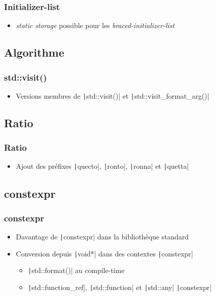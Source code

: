 \documentclass[C++.tex]{subfiles}
\begin{document}
\begin{frame}[fragile]
	\frametitle{Initializer-list}
	\begin{itemize}
		\item \textit{static storage} possible pour les \textit{braced-initializer-list}
		
	\end{itemize}
\end{frame}

\subsection*{Algorithme}
\begin{frame}[fragile]
	\frametitle{{\NoAutoSpacing std::visit()}}
	\begin{itemize}
		\item Versions membres de \texttt|std::visit()| et \texttt|std::visit_format_arg()|
	\end{itemize}
\end{frame}

\subsection*{Ratio}
\begin{frame}[fragile]
	\frametitle{Ratio}
	\begin{itemize}
		\item Ajout des préfixes \texttt|quecto|, \texttt|ronto|, \texttt|ronna| et \texttt|quetta|
	\end{itemize}
\end{frame}

\subsection*{constexpr}
\begin{frame}[fragile]
	\frametitle{constexpr}
	\begin{itemize}
		\item Davantage de \texttt|constexpr| dans la bibliothèque standard
		\item Conversion depuis \texttt|void*| dans des contextes \texttt|constexpr|
		\begin{itemize}
			\item \texttt|std::format()| au compile-time
			\item \texttt|std::function_ref|, \texttt|std::function| et \texttt|std::any| \texttt|constexpr|
		\end{itemize}
	\end{itemize}
\end{frame}
\end{document}
